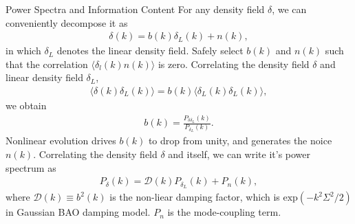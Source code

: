 \begin{section}{Power Spectra and Information Content}
    For any density field $\delta$, we can conveniently decompose it as
\begin{align}
    \delta (k) = b (k) \delta _L (k) + n (k),
\label{eq:decompose}
\end{align}
in which $\delta_L$ denotes the linear density field. Safely select $b (k)$ and $n (k)$ 
such that the correlation $\langle \delta_l (k) n (k) \rangle$ is zero. Correlating the density field 
$\delta$ and linear density field $\delta_L$,
\begin{align}
   \langle \delta (k) \delta_L (k) \rangle = b (k) \langle \delta_L (k) \delta_L (k) \rangle,
\label{eq:correlating}
\end{align} 
    we obtain
\begin{align}
    b (k) = \frac{P _{\delta \delta_L}(k)}{P_{\delta_L}(k)}.
\label{eq:bofk}
\end{align}
Nonlinear evolution drives $b (k)$ to drop from unity, and generates the noice $n (k)$. 
Correlating the density field $\delta$ and itself, we can write it's power spectrum as
\begin{align}
   P_\delta (k) = \mathcal{D} (k) P_{\delta_L} (k) + P_n (k),
\label{eq:powerdecompose}
\end{align}
where $\mathcal{D}(k) \equiv b^2 (k)$ is the non-liear damping factor, which is $\mathrm{exp}(-k^2 \Sigma^2/2)$ 
in Gaussian BAO damping model. $P_n$ is the mode-coupling term.


\end{section}
